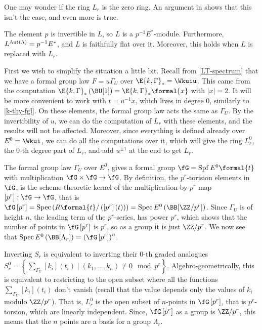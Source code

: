 One may wonder if the ring $L_r$ is the zero ring.
An argument in \cite{HKR} shows that this isn't the case, and even more is true.

\begin{proposition}\label{Lr-fixed-points}
	The element $p$ is invertible in $L$, so $L$ is a $p^{-1} E^*$-module.
	Furthermore, $L^{\operatorname{Aut} \left(\Lambda\right)} = p^{-1} E^*$, and $L$ is faithfully flat over it.
	Moreover, this holds when $L$ is replaced with $L_r$.
\end{proposition}

\begin{remark}\label{alg-geo-Lr}
	First we wish to simplify the situation a little bit.
	Recall from \ref{LT-spectrum} that we have a formal group law $F = u \Gamma_U$ over $\E{k, \Gamma}_* = \Wkuiu$.
	This came from the computation $\E{k, \Gamma}_*\left(\BU[1]\right) = \E{k, \Gamma}_* \formal{x}$ with $\left|x\right| = 2$.
	It will be more convenient to work with $t = u^{-1} x$, which lives in degree $0$, similarly to \ref{k-thy-fgl}.
	On these elements, the formal group law acts the same as $\Gamma_U$.
	By the invertibility of $u$, we can do the computation of $L_r$ with these elements, and the results will not be affected.
	Moreover, since everything is defined already over $E^0 = \Wkui$, we can do all the computations over it, which will give the ring $L_r^0$, the $0$-th degree part of $L_r$, and add $u^{\pm 1}$ at the end to get $L_r$.
	
	The formal group law $\Gamma_U$ over $E^0$, gives a formal group $\fG = \spf E^0\formal{t}$ with multiplication $\fG \times \fG \to \fG$.
	By definition, the $p^r$-torision elements in $\fG$, is the scheme-theoretic kernel of the multiplication-by-$p^r$ map $\left[p^r\right]: \fG \to \fG$, that is $\fG\left[p^r\right] = \spec\left(R\formal{t}/\left(\left[p^r\right]\left(t\right)\right)\right) = \spec E^0\left(\BB[\ZZ / p^r]\right)$.
	Since $\Gamma_U$ is of height $n$, the leading term of the $p^r$-series, has power $p^r$, which shows that the number of points in $\fG\left[p^r\right]$ is $p^r$, so as a group it is just $\ZZ/p^r$. 
	We now see that $\spec E^0\left(\BB[\Lambda_r]\right) = \left(\fG\left[p^r\right]\right)^n$.
	
	Inverting $S_r$ is equivalent to inverting their $0$-th graded analogues $S_r^0 = \left\{ \sum_{\Gamma_U} [k_i]\left(t_i\right) \mid \left(k_1, \dotsc, k_n\right) \neq 0 \mod p^r\right\}$.
	Algebro-geometrically, this is equivalent to restricting to the open subset where all the functions $\sum_{\Gamma_U} [k_i]\left(t_i\right)$ don't vanish (recall that the value depends only the values of $k_i$ modulo $\ZZ/p^r$).
	That is, $L_r^0$ is the open subset of $n$-points in $\fG\left[p^r\right]$, that is $p^r$-torsion, which are linearly independent.
	Since, $\fG\left[p^r\right]$ as a group is $\ZZ/p^r$, this means that the $n$ points are a basis for a group $\Lambda_r$.
	

\end{remark}
